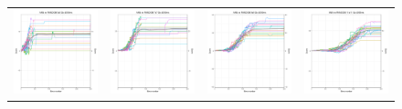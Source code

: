 \begin{figure}
\begin{tabular}{cccc}
\hspace{-0.5cm}\includegraphics[width = 1.55in]{images/Visualizations/ANNvsRANDOM/4000ms5x5.png} &
\hspace{-0.5cm}\includegraphics[width = 1.55in]{images/Visualizations/ANNvsRANDOM/4000ms7x7.png} &
\hspace{-0.5cm}\includegraphics[width = 1.55in]{images/Visualizations/ANNvsRANDOM/4000ms9x9.png} &
\hspace{-0.5cm}\includegraphics[width = 1.55in]{images/Visualizations/ANNvsRANDOM/4000ms11x11.png} \\


\end{tabular}
\end{figure}
